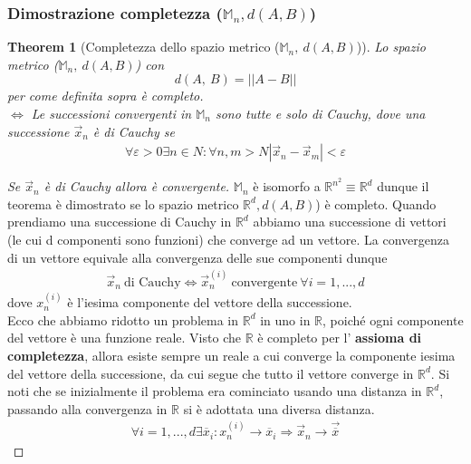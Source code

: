 \documentclass[10pt,a4paper]{article}
\newtheorem{theorem}{Theorem}
\newtheorem{proof}{Proof}
\begin{document}
\subsubsection{Dimostrazione completezza (\(\mathbb{M}_n,d(A,B)\))}
\begin{theorem}[Completezza dello spazio metrico (\(\mathbb{M}_n,\ d(A,B)\))]
	Lo spazio metrico (\(\mathbb{M}_n,\ d(A,B)\)) con \[d(A,\ B) = ||A-B||\] per come definita sopra è completo.\\
	\(\Leftrightarrow \) Le successioni convergenti in \(\mathbb{M}_n\) sono tutte e solo di Cauchy, dove una successione \(\vec{x}_n\) è di Cauchy se 
	\begin{align}\label{eq:defcauchy}
		\forall \varepsilon> 0 \exists n \in N : \forall n,m > N |\vec{x}_n-\vec{x}_m|<\varepsilon
	\end{align}
\end{theorem}
\begin{proof}[Se \(\vec{x}_n\) è di Cauchy allora è convergente]
	\(\mathbb{M}_n\) è isomorfo a $\mathbb{R}^{n^2}\equiv\mathbb{R}^d$ dunque il teorema è dimostrato se lo spazio metrico \(\mathbb{R}^d,d(A,B)\)) è completo. Quando prendiamo una successione di Cauchy in $\mathbb{R}^d$ abbiamo una successione di vettori (le cui d componenti sono funzioni) che converge ad un vettore. La convergenza di un vettore equivale alla convergenza delle sue componenti dunque
	\begin{align*}
		\vec{x}_n\ \text{di Cauchy} \Leftrightarrow \vec{x}_n^{(i)}\ \text{convergente}\ \forall i= 1,...,d
	\end{align*}
	dove \(x_n^{(i)}\) è l'iesima componente del vettore della successione.\\ 
	Ecco che abbiamo ridotto un problema in $\mathbb{R}^d$ in uno in $\mathbb{R}$, poiché ogni componente del vettore è una funzione reale. Visto che $\mathbb{R}$ è completo per l' \textbf{assioma di completezza}, allora esiste sempre un reale a cui converge la componente iesima del vettore della successione, da cui segue che tutto il vettore converge in $\mathbb{R}^d$. Si noti che se inizialmente il problema era cominciato usando una distanza in $\mathbb{R}^d$, passando alla convergenza in $\mathbb{R}$ si è adottata una diversa distanza. 
	\begin{align*}
		\forall i = 1,...,d \exists \overline{x}_i : x_n^{(i)}\rightarrow \overline{x}_i \Rightarrow  \vec{x}_n\rightarrow \vec{\overline{x}}
	\end{align*} 
\end{proof}
\end{document}
